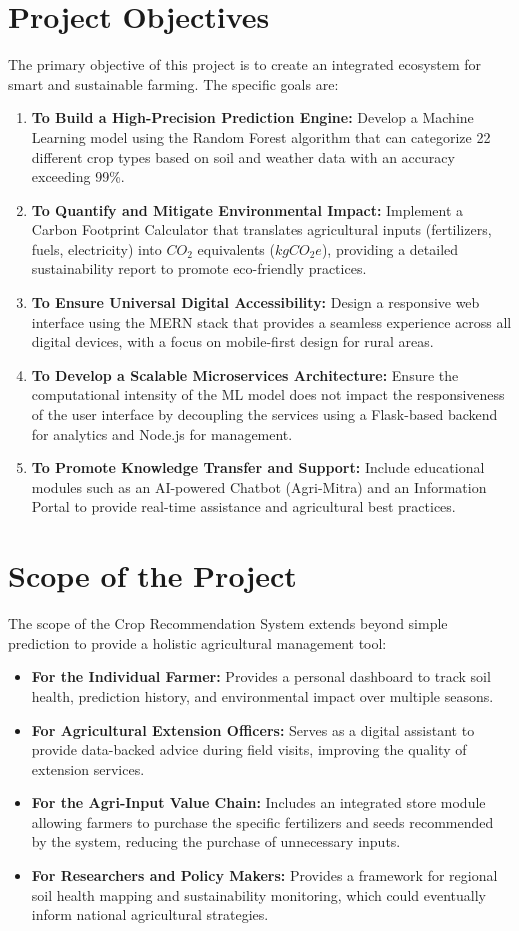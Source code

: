 \documentclass[12pt,a4paper]{report}
\begin{document}
\section{Project Objectives}
The primary objective of this project is to create an integrated ecosystem for smart and sustainable farming. The specific goals are:
\begin{enumerate}
    \item \textbf{To Build a High-Precision Prediction Engine:} Develop a Machine Learning model using the Random Forest algorithm that can categorize 22 different crop types based on soil and weather data with an accuracy exceeding 99\%.
    \item \textbf{To Quantify and Mitigate Environmental Impact:} Implement a Carbon Footprint Calculator that translates agricultural inputs (fertilizers, fuels, electricity) into $CO_2$ equivalents ($kgCO_2e$), providing a detailed sustainability report to promote eco-friendly practices.
    \item \textbf{To Ensure Universal Digital Accessibility:} Design a responsive web interface using the MERN stack that provides a seamless experience across all digital devices, with a focus on mobile-first design for rural areas.
    \item \textbf{To Develop a Scalable Microservices Architecture:} Ensure the computational intensity of the ML model does not impact the responsiveness of the user interface by decoupling the services using a Flask-based backend for analytics and Node.js for management.
    \item \textbf{To Promote Knowledge Transfer and Support:} Include educational modules such as an AI-powered Chatbot (Agri-Mitra) and an Information Portal to provide real-time assistance and agricultural best practices.
\end{enumerate}

\section{Scope of the Project}
The scope of the Crop Recommendation System extends beyond simple prediction to provide a holistic agricultural management tool:
\begin{itemize}
    \item \textbf{For the Individual Farmer:} Provides a personal dashboard to track soil health, prediction history, and environmental impact over multiple seasons.
    \item \textbf{For Agricultural Extension Officers:} Serves as a digital assistant to provide data-backed advice during field visits, improving the quality of extension services.
    \item \textbf{For the Agri-Input Value Chain:} Includes an integrated store module allowing farmers to purchase the specific fertilizers and seeds recommended by the system, reducing the purchase of unnecessary inputs.
    \item \textbf{For Researchers and Policy Makers:} Provides a framework for regional soil health mapping and sustainability monitoring, which could eventually inform national agricultural strategies.
\end{itemize}
\end{document}
